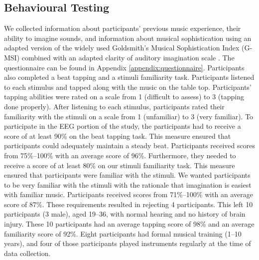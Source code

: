 \subsection{Behavioural Testing}
We collected information about participants' previous music experience, their ability to imagine sounds, and information about musical sophistication using an adapted version of the widely used Goldsmith's Musical Sophistication Index (G-MSI) \cite{mullensiefen_musicality_2014} combined with an adapted clarity of auditory imagination scale \cite{willander_imagery_scale_2010}. 
The questionnaire can be found in Appendix \ref{appendix:questionnaire}.
Participants also completed a beat tapping and a stimuli familiarity task. 
Participants listened to each stimulus and tapped along with the music on the table top. 
Participants'  tapping abilities were rated on a scale from 1 (difficult to assess) to 3 (tapping done properly). 
After listening to each stimulus, participants rated their familiarity with the stimuli on a scale from 1 (unfamiliar) to 3 (very familiar).
To participate in the \ac{EEG} portion of the study, the participants had to receive a score of at least 90\% on the beat tapping task.
This measure ensured that participants could adequately maintain a steady beat.
Participants received scores from 75\%--100\% with an average score of 96\%.
Furthermore, they needed to receive a score of at least 80\% on our stimuli familiarity task. 
This measure ensured that participants were familiar with the stimuli.
We wanted participants to be very familiar with the stimuli with the rationale that imagination is easiest with familiar music.
Participants received scores from 71\%--100\% with an average score of 87\%.
These requirements resulted in rejecting 4 participants.
This left 10 participants (3 male), aged 19--36, with normal hearing and no history of brain injury. 
These 10 participants had an average tapping score of 98\% and an average familiarity score of 92\%.
Eight participants had formal musical training (1--10 years), and four of those participants played instruments regularly at the time of data collection.


